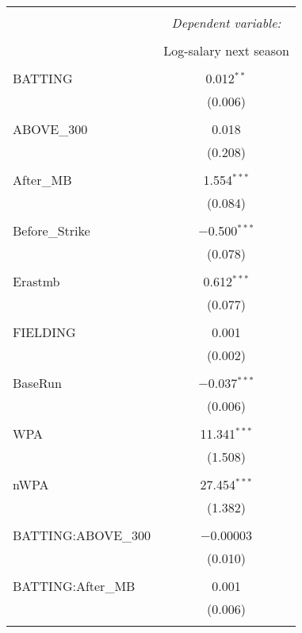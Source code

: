 
\begin{table}[!htbp] \centering
  \caption{}
  \label{}
  \scriptsize
\begin{tabular}{@{\extracolsep{5pt}}lc}
\\[-1.8ex]\hline
\hline \\[-1.8ex]
 & \multicolumn{1}{c}{\textit{Dependent variable:}} \\
\cline{2-2}
\\[-1.8ex] & Log-salary next season \\
\hline \\[-1.8ex]
 BATTING & 0.012$^{**}$ \\
  & (0.006) \\
  & \\
 ABOVE\_300 & 0.018 \\
  & (0.208) \\
  & \\
 After\_MB & 1.554$^{***}$ \\
  & (0.084) \\
  & \\
 Before\_Strike & $-$0.500$^{***}$ \\
  & (0.078) \\
  & \\
 Erastmb & 0.612$^{***}$ \\
  & (0.077) \\
  & \\
 FIELDING & 0.001 \\
  & (0.002) \\
  & \\
 BaseRun & $-$0.037$^{***}$ \\
  & (0.006) \\
  & \\
 WPA & 11.341$^{***}$ \\
  & (1.508) \\
  & \\
 nWPA & 27.454$^{***}$ \\
  & (1.382) \\
  & \\
 BATTING:ABOVE\_300 & $-$0.00003 \\
  & (0.010) \\
  & \\
 BATTING:After\_MB & 0.001 \\
  & (0.006) \\
  & \\

\end{tabular}
\end{table}
